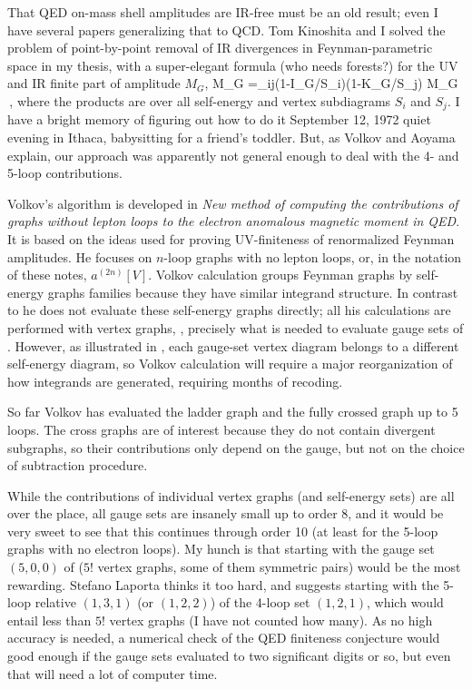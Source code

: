 That QED on-mass shell amplitudes are IR-free must be an old result; even
I have several papers generalizing that to
QCD. Tom Kinoshita and I solved
the problem of point-by-point removal of IR divergences in
Feynman-parametric space in my thesis, with a
super-elegant formula (who needs forests?) for the UV and IR finite part
of amplitude $M_G$,
\beq
\Delta M_G =\prod_{ij}(1-I_{G/S_i})(1-K_{G/S_j}) M_G
\,,
where the products are over all self-energy and vertex subdiagrams $S_i$
and $S_j$.
I have a bright memory of figuring out how to do it September 12, 1972 quiet
evening in Ithaca,
{babysitting} for a friend's toddler. But, as Volkov and Aoyama
\etal{} explain, our approach was apparently not general enough to
deal with the 4- and 5-loop contributions.

Volkov's algorithm is developed in {\em New method of computing the
contributions of graphs without lepton loops to the electron anomalous
magnetic moment in {QED}}. It is based on the ideas used for
proving UV-finiteness of renormalized Feynman
amplitudes. He focuses on $n$-loop graphs with no
lepton loops, or, in the notation of these notes, $a^{(2n)}[V]$.
%
Volkov calculation groups Feynman graphs by self-energy graphs families
because they have similar integrand structure. In contrast to
 he does not evaluate
these self-energy graphs directly; all his calculations are performed
with vertex graphs, \ie, precisely what is needed to evaluate gauge sets
of . However, as illustrated in
, each gauge-set vertex diagram belongs to a
different self-energy diagram, so Volkov calculation will require a major
reorganization of how integrands are generated, requiring months
of recoding.

So far Volkov  has evaluated the ladder graph
and the fully crossed graph
up to 5 loops. The cross graphs are of interest because they do not
contain divergent subgraphs, so their contributions only depend on the
gauge, but not on the choice of subtraction procedure.

While the contributions of individual vertex graphs (and self-energy
sets) are all over the place, all gauge sets are
insanely small up to order 8, and it would be very sweet to see that this
continues through order 10 (at least for the 5-loop graphs with no
electron loops).
My hunch is that starting with the gauge set $(5,0,0)$ of
 ($5!$ vertex graphs, some of them symmetric pairs)
would be the most rewarding.
Stefano Laporta thinks it too hard, and suggests starting with the 5-loop
relative
$(1,3,1)$ (or $(1,2,2)$) of the 4-loop set $(1,2,1)$,
which would entail less than $5!$ vertex graphs (I have not counted
how many). As no high accuracy is needed, a numerical check of the QED
finiteness conjecture would good enough if the gauge sets evaluated
to two significant digits or so, but even that will need a lot of
computer time.


